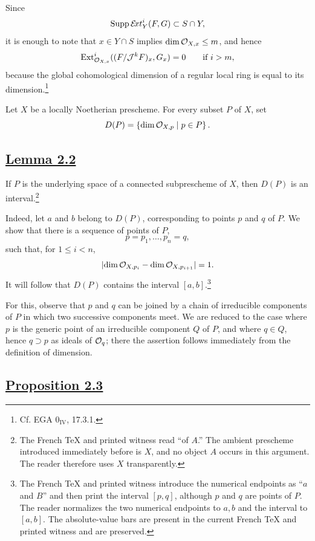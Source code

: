 Since
\[
  \operatorname{Supp}\mathcal E\!xt_Y^i(F,G)\subset S\cap Y,
\]
it is enough to note that $x\in Y\cap S$ implies
$\dim\mathcal O_{X,x}\leq m$, and hence
\[
  \operatorname{Ext}^i_{\mathcal O_{X,x}}((F/\mathcal J^kF)_x,G_x)=0
  \qquad\text{if }i>m,
\]
because the global cohomological dimension of a regular local ring is equal
to its dimension.\footnote{Cf. EGA $0_{\mathrm{IV}}$, 17.3.1.}

Let $X$ be a locally Noetherian prescheme. For every subset $P$ of $X$, set
\[
  D(P)=\left\{\dim\mathcal O_{X,p}\mid p\in P\right\}.
\]

\subsection*{\hyperref[VII.2.2]{Lemma 2.2}}

If $P$ is the underlying space of a connected subprescheme of $X$, then
$D(P)$ is an interval.\footnote{The French TeX and printed witness read
``of $A$.'' The ambient prescheme introduced immediately before is $X$, and
no object $A$ occurs in this argument. The reader therefore uses $X$
transparently.}

Indeed, let $a$ and $b$ belong to $D(P)$, corresponding to points $p$ and $q$
of $P$. We show that there is a sequence of points of $P$,
\[
  p=p_1,\ldots,p_n=q,
\]
such that, for $1\leq i<n$,
\[
  \lvert\dim\mathcal O_{X,p_i}-\dim\mathcal O_{X,p_{i+1}}\rvert=1.
\]
It will follow that $D(P)$ contains the interval $[a,b]$.\footnote{The French
TeX and printed witness introduce the numerical endpoints as ``$a$ and $B$''
and then print the interval $[p,q]$, although $p$ and $q$ are points of $P$.
The reader normalizes the two numerical endpoints to $a,b$ and the interval to
$[a,b]$. The absolute-value bars are present in the current French TeX and
printed witness and are preserved.}

For this, observe that $p$ and $q$ can be joined by a chain of irreducible
components of $P$ in which two successive components meet. We are reduced to
the case where $p$ is the generic point of an irreducible component $Q$ of
$P$, and where $q\in Q$, hence $q\supset p$ as ideals of $\mathcal O_q$; there the
assertion follows immediately from the definition of dimension.

\clearpage
\subsection*{\hyperref[VII.2.3]{Proposition 2.3}}

